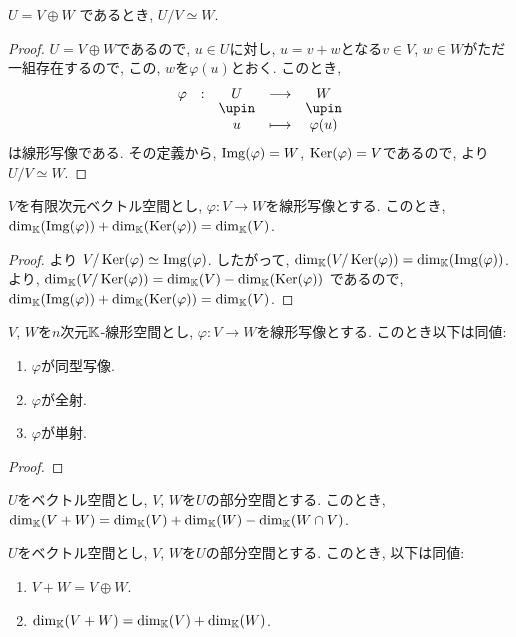 \begin{cor}
$U=V\oplus W$
  であるとき, $U/V\simeq W$.
\end{cor}
\begin{proof}
$U=V\oplus W$であるので,
  $u\in U$に対し,
  $u=v+w$となる$v\in V$, $w\in W$がただ一組存在するので,
  この, $w$を$\varphi(u)$とおく.
  このとき,
  \begin{align*}
    \shazo{\varphi}{U}{W}{u}{\varphi(u)}
  \end{align*}
  は線形写像である.
  その定義から, $\operatorname{Img}(\varphi)=W$, $\operatorname{Ker}(\varphi)=V$であるので,
  より $U/V\simeq W$.
\end{proof}


\begin{cor}
\label{thm:dimthm}
  $V$を有限次元ベクトル空間とし,
  $\varphi\colon V\to W$を線形写像とする.
  このとき,
  $\dim_{\mathbb{K}}(\operatorname{Img}(\varphi))+\dim_{\mathbb{K}}(\operatorname{Ker}(\varphi))=\dim_{\mathbb{K}}(V)$.
\end{cor}
\begin{proof}
  より $V/\operatorname{Ker}(\varphi) \simeq \operatorname{Img}(\varphi)$.
  したがって,
  $\dim_{\mathbb{K}}(V/\operatorname{Ker}(\varphi))=\dim_{\mathbb{K}}(\operatorname{Img}(\varphi))$.
  より,
  $\dim_{\mathbb{K}}(V/\operatorname{Ker}(\varphi))=\dim_{\mathbb{K}}(V)-\dim_{\mathbb{K}}(\operatorname{Ker}(\varphi))$
  であるので,
  $\dim_{\mathbb{K}}(\operatorname{Img}(\varphi))+\dim_{\mathbb{K}}(\operatorname{Ker}(\varphi))=\dim_{\mathbb{K}}(V)$.
\end{proof}
\begin{cor}
  $V$, $W$を$n$次元$\mathbb{K}$-線形空間とし,
  $\varphi\colon V\to W$を線形写像とする.
  このとき以下は同値:
  \begin{enumerate}
  \item $\varphi$が同型写像.
  \item $\varphi$が全射.
  \item $\varphi$が単射.
  \end{enumerate}
\end{cor}
\begin{proof}\end{proof}


\begin{prop}
  $U$をベクトル空間とし, $V$, $W$を$U$の部分空間とする.
  このとき,  $\dim_{\mathbb{K}}(V+W)=\dim_{\mathbb{K}}(V)+\dim_{\mathbb{K}}(W) - \dim_{\mathbb{K}}(W\cap V)$.
\end{prop}

\begin{cor}
  $U$をベクトル空間とし, $V$, $W$を$U$の部分空間とする.
  このとき, 以下は同値:
  \begin{enumerate}
  \item $V+W=V\oplus W$.
  \item $\dim_{\mathbb{K}}(V+W)=\dim_{\mathbb{K}}(V)+\dim_{\mathbb{K}}(W)$.
  \end{enumerate}
\end{cor}

